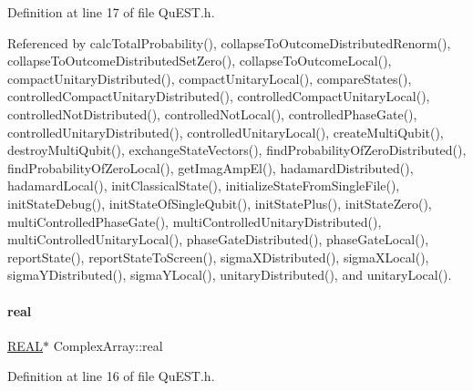 Definition at line 17 of file Qu\+E\+S\+T.\+h.



Referenced by calc\+Total\+Probability(), collapse\+To\+Outcome\+Distributed\+Renorm(), collapse\+To\+Outcome\+Distributed\+Set\+Zero(), collapse\+To\+Outcome\+Local(), compact\+Unitary\+Distributed(), compact\+Unitary\+Local(), compare\+States(), controlled\+Compact\+Unitary\+Distributed(), controlled\+Compact\+Unitary\+Local(), controlled\+Not\+Distributed(), controlled\+Not\+Local(), controlled\+Phase\+Gate(), controlled\+Unitary\+Distributed(), controlled\+Unitary\+Local(), create\+Multi\+Qubit(), destroy\+Multi\+Qubit(), exchange\+State\+Vectors(), find\+Probability\+Of\+Zero\+Distributed(), find\+Probability\+Of\+Zero\+Local(), get\+Imag\+Amp\+El(), hadamard\+Distributed(), hadamard\+Local(), init\+Classical\+State(), initialize\+State\+From\+Single\+File(), init\+State\+Debug(), init\+State\+Of\+Single\+Qubit(), init\+State\+Plus(), init\+State\+Zero(), multi\+Controlled\+Phase\+Gate(), multi\+Controlled\+Unitary\+Distributed(), multi\+Controlled\+Unitary\+Local(), phase\+Gate\+Distributed(), phase\+Gate\+Local(), report\+State(), report\+State\+To\+Screen(), sigma\+X\+Distributed(), sigma\+X\+Local(), sigma\+Y\+Distributed(), sigma\+Y\+Local(), unitary\+Distributed(), and unitary\+Local().

\mbox{\label{structComplexArray_a4195cac6c784ea1b6271f1c7dba1548a}} 
\paragraph{\texorpdfstring{real}{real}}
{\footnotesize\ttfamily \mbox{\hyperlink{QuEST__precision_8h_a4b654506f18b8bfd61ad2a29a7e38c25}{R\+E\+AL}}$\ast$ Complex\+Array\+::real}



Definition at line 16 of file Qu\+E\+S\+T.\+h.



